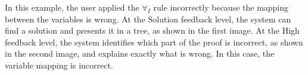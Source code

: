 \begin{center}
\end{center}

In this example, the user applied the \(\forall_I\) rule incorrectly because the mapping between the variables is wrong. At the Solution feedback level, the system can find a solution and presents it in a tree, as shown in the first image. At the High feedback level, the system identifies which part of the proof is incorrect, as shown in the second image, and explains exactly what is wrong. In this case, the variable mapping is incorrect.

